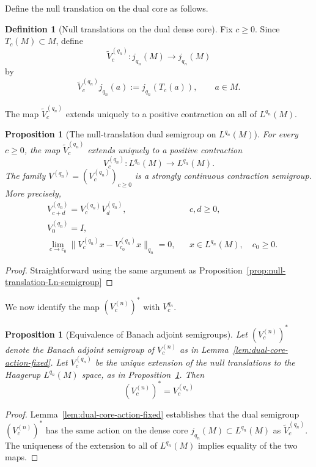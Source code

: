\documentclass[11pt,a4paper]{article}
\theoremstyle{plain}
\numberwithin{theorem}{section}
\newtheorem{proposition}[theorem]{Proposition}
\theoremstyle{definition}
\newtheorem{definition}[theorem]{Definition}
\newcommand{\?}{\overset{?}{=}}
\begin{document}
Define the null translation on the dual core as follows.
\begin{definition}[Null translations on the dual dense core]
\label{def:Vc-dual-def-dense}
Fix \(c\geq0\).  Since \(T_c(M)\subset M\), define
\[
        \widetilde V_c^{(q_n)}:j_{q_n}(M)\longrightarrow j_{q_n}(M)
\]
by
\begin{equation}
\label{eq:Vc-dual-defn}
        \widetilde V_c^{(q_n)}j_{q_n}(a)
        :=
        j_{q_n}(T_c(a)),
        \qquad a\in M.
\end{equation}
\end{definition}
The map $\widetilde V_c^{(q_n)}$ extends uniquely to a positive contraction on all of $L^{q_n}(M)$.
\begin{proposition}[The null-translation dual semigroup on \(L^{q_n}(M)\)]
\label{prop:null-translation-Lqn-semigroup}
For every \(c\geq0\), the map
\(\widetilde V_c^{(q_n)}\) extends uniquely to a positive contraction
\[
        V_c^{(q_n)}:L^{q_n}(M)\longrightarrow L^{q_n}(M).
\]
The family \(V^{(q_n)}=(V_c^{(q_n)})_{c\geq0}\) is a strongly continuous
contraction semigroup.  More precisely,
\begin{align}
        &V_{c+d}^{(q_n)}
        =
        V_c^{(q_n)}V_d^{(q_n)},
        &&c,d\geq0,                                      \label{eq:V-semigroup-dual}\\
        &V_0^{(q_n)}
        =
        I,                                                \label{eq:V-identity-dual}\\
        &\lim_{c\to c_0}
        \|V_c^{(q_n)}x-V_{c_0}^{(q_n)}x\|_{q_n}
        =
        0,
        &&x\in L^{q_n}(M),\quad c_0\geq0.                    \label{eq:V-strong-cont-dual}
\end{align}
\end{proposition}
\begin{proof}
    Straightforward using the same argument as Proposition~\ref{prop:null-translation-Ln-semigroup}
\end{proof}

We now identify the map $(V_c^{(n)})^*$ with $V_c^{q_n}$.
\begin{proposition}[Equivalence of Banach adjoint semigroups]\label{prop:equal-dual-semigroups}
    Let $(V_c^{(n)})^*$ denote the Banach adjoint semigroup of $V_c^{(n)}$ as in Lemma~\ref{lem:dual-core-action-fixed}. Let $V_c^{(q_n)}$ be the unique extension of the null translations to the Haagerup $L^{q_n}(M)$ space, as in Proposition~\ref{prop:null-translation-Lqn-semigroup}. Then
    \[
        (V_c^{(n)})^*=V_c^{(q_n)}
    \]
\end{proposition}
\begin{proof}
    Lemma~\ref{lem:dual-core-action-fixed} establishes that the dual semigroup $(V_c^{(n)})^*$ has the same action on the dense core $j_{q_n}(M)\subset L^{q_n}(M)$ as $\widetilde V^{(q_n)}_c$. The uniqueness of the extension to all of $L^{q_n}(M)$ implies equality of the two maps.
\end{proof}
\end{document}

